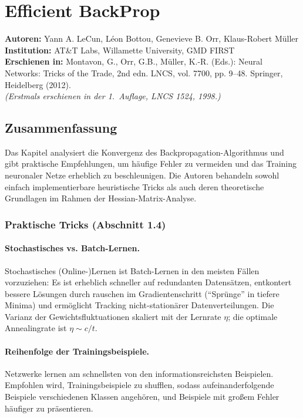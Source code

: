 \documentclass[a4paper,12pt]{article}
\begin{document}
\section*{Efficient BackProp}

\textbf{Autoren:} Yann A. LeCun, Léon Bottou, Genevieve B. Orr, Klaus-Robert Müller \\
\textbf{Institution:} AT\&T Labs, Willamette University, GMD FIRST \\
\textbf{Erschienen in:} Montavon, G., Orr, G.B., Müller, K.-R. (Eds.): Neural Networks: Tricks of the Trade, 2nd edn. LNCS, vol. 7700, pp. 9--48. Springer, Heidelberg (2012). \\
\textit{(Erstmals erschienen in der 1.~Auflage, LNCS 1524, 1998.)}

\subsection*{Zusammenfassung}

Das Kapitel analysiert die Konvergenz des Backpropagation-Algorithmus und gibt praktische Empfehlungen, um häufige Fehler zu vermeiden und das Training neuronaler Netze erheblich zu beschleunigen. Die Autoren behandeln sowohl einfach implementierbare heuristische Tricks als auch deren theoretische Grundlagen im Rahmen der Hessian-Matrix-Analyse.

\subsubsection*{Praktische Tricks (Abschnitt 1.4)}

\paragraph{Stochastisches vs. Batch-Lernen.}
Stochastisches (Online-)Lernen ist Batch-Lernen in den meisten Fällen vorzuziehen: Es ist erheblich schneller auf redundanten Datensätzen, entkontert bessere Lösungen durch rauschen im Gradientenschritt (``Sprünge'' in tiefere Minima) und ermöglicht Tracking nicht-stationärer Datenverteilungen. Die Varianz der Gewichtsfluktuationen skaliert mit der Lernrate $\eta$; die optimale Annealingrate ist $\eta \sim c/t$.

\paragraph{Reihenfolge der Trainingsbeispiele.}
Netzwerke lernen am schnellsten von den informationsreichsten Beispielen. Empfohlen wird, Trainingsbeispiele zu shufflen, sodass aufeinanderfolgende Beispiele verschiedenen Klassen angehören, und Beispiele mit großem Fehler häufiger zu präsentieren.
\end{document}
